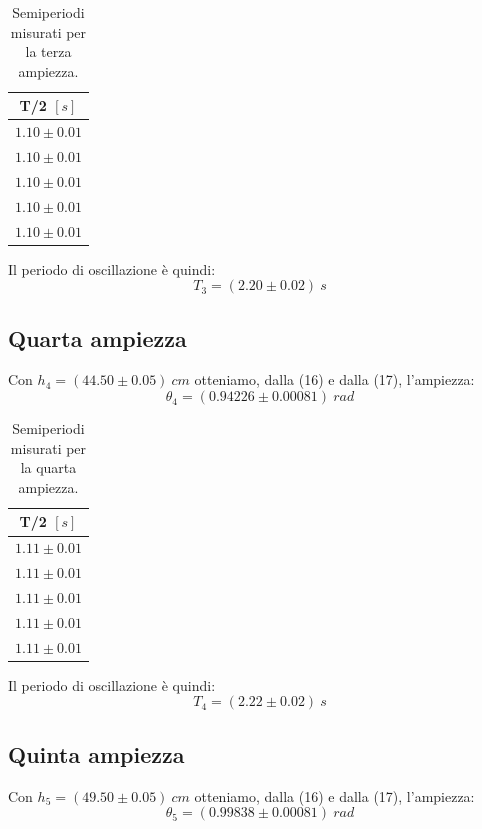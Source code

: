 \documentclass[11pt]{article}
\begin{document}
\begin{table}[H]
\centering
\begin{tabular}{|c|}
\hline
\textbf{T/2 $[s]$} \\
\hline
$1.10\pm 0.01$ \\
$1.10\pm 0.01$ \\
$1.10\pm 0.01$ \\
$1.10\pm 0.01$ \\
$1.10\pm 0.01$ \\
\hline
\end{tabular}
\caption{Semiperiodi misurati per la terza ampiezza.}
\label{tab:}
\end{table}
Il periodo di oscillazione è quindi:
\begin{equation}
    T_3=(2.20\pm 0.02)\ s
\end{equation}

\subsection{Quarta ampiezza}
Con $h_4=(44.50\pm 0.05)\ cm$ otteniamo, dalla (16) e dalla (17), l'ampiezza:
\begin{equation}
    \theta_4= (0.94226\pm 0.00081)\ rad
\end{equation}

\begin{table}[H]
\centering
\begin{tabular}{|c|}
\hline
\textbf{T/2 $[s]$} \\
\hline
$1.11\pm 0.01$ \\
$1.11\pm 0.01$ \\
$1.11\pm 0.01$ \\
$1.11\pm 0.01$ \\
$1.11\pm 0.01$ \\
\hline
\end{tabular}
\caption{Semiperiodi misurati per la quarta ampiezza.}
\label{tab:}
\end{table}
Il periodo di oscillazione è quindi:
\begin{equation}
    T_4=(2.22\pm 0.02)\ s
\end{equation}

\subsection{Quinta ampiezza}
Con $h_5=(49.50\pm 0.05)\ cm$ otteniamo, dalla (16) e dalla (17), l'ampiezza:
\begin{equation}
    \theta_5 = (0.99838\pm 0.00081)\ rad
\end{equation}
\end{document}

